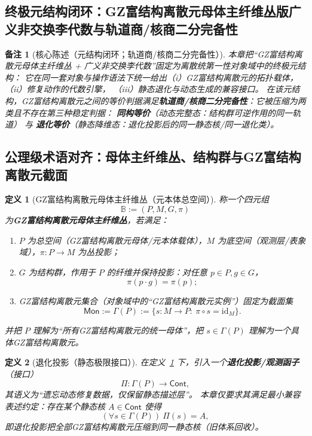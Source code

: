 \documentclass[12pt]{article}
\newtheorem{definition}{定义}[section]
\newtheorem{remark}{备注}[section]
\newcommand{\KouJing}{\texorpdfstring{表述约定}{表述约定}}
\newcommand{\GZMon}{\texorpdfstring{GZ富结构离散元}{GZ富结构离散元}}
\newcommand{\GZMonMotherBundle}{\texorpdfstring{GZ富结构离散元母体主纤维丛}{GZ富结构离散元母体主纤维丛}}
\begin{document}
\begin{CJK*}{UTF8}{gkai}
\clearpage

\section{终极元结构闭环：\GZMonMotherBundle{}版广义非交换李代数与轨道商/核商二分完备性}
\label{sec:tex29-meta-structure}
\label{sec:tex29-ch18}

\begin{remark}[核心陈述（元结构闭环；轨道商/核商二分完备性）]
本章把“\GZMonMotherBundle{} + 广义非交换李代数”固定为离散统第一性对象域中的终极元结构：
它在同一套对象与操作语法下统一给出（i）\GZMon{}的拓扑载体，（ii）修复动作的代数引擎，
（iii）静态退化与动态生成的兼容接口。
在该元结构，\GZMon{}之间的等价判据满足\textbf{轨道商/核商二分完备性}：它被压缩为两类且不存在第三种稳定判据：
\textbf{同构等价}（动态完整态：结构群可逆作用的同一轨道）
与 \textbf{退化等价}（静态降维态：退化投影后的同一静态核/同一退化类）。
\end{remark}

\subsection{公理级术语对齐：母体主纤维丛、结构群与\GZMon{}截面}
\label{subsec:tex29-meta-alignment}

\begin{definition}[\GZMonMotherBundle{}（元本体总空间）]
\label{def:tex29-meta-mother-bundle}
称一个四元组
\[
  \mathbb{B}:=(P,M,G,\pi)
\]
为\textbf{\GZMonMotherBundle{}}，若满足：
\begin{enumerate}
  \item $P$ 为总空间（\GZMon{}母体/元本体载体），$M$ 为底空间（观测层/表象域），$\pi:P\to M$ 为丛投影；
  \item $G$ 为结构群，作用于 $P$ 的纤维并保持投影：对任意 $p\in P,g\in G$，
  \[
    \pi(p\cdot g)=\pi(p);
  \]
  \item \GZMon{}集合（对象域中的“\GZMon{}实例”）固定为截面集
  \[
    \mathsf{Mon}:=\Gamma(P):=\{s:M\to P:\ \pi\circ s=\mathrm{id}_{M}\}.
  \]
\end{enumerate}
并把 $P$ 理解为“所有\GZMon{}的统一母体”，把 $s\in\Gamma(P)$ 理解为一个具体\GZMon{}。
\end{definition}

\begin{definition}[退化投影（静态极限接口）]
\label{def:tex29-meta-degeneration}
在定义~\ref{def:tex29-meta-mother-bundle} 下，引入一个\textbf{退化投影/观测函子}（接口）
\[
  \Pi:\Gamma(P)\to \mathsf{Cont},
\]
其语义为“遗忘动态修复数据，仅保留静态描述层”。
本章仅要求其满足最小兼容\KouJing：存在某个静态核 $A\in\mathsf{Cont}$ 使得
\[
  (\forall s\in\Gamma(P))\ \Pi(s)=A,
\]
即退化投影把全部\GZMon{}压缩到同一静态核（旧体系回收）。
\end{definition}


\end{CJK*}
\end{document}
